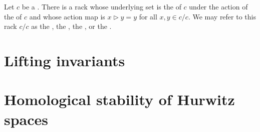 



















\begin{definition} \label{definition:set_of_components_of_a_rack}
    Let $c$ be a . 
    There is a rack whose underlying set is the  of $c$ under the action of the  of $c$ and whose action map is  $x \rhd y = y$ for all $x,y \in c/c$. We may refer to this rack $c/c$ as the , the , the , or the .
\end{definition}



\section{Lifting invariants}




\section{Homological stability of Hurwitz spaces}









